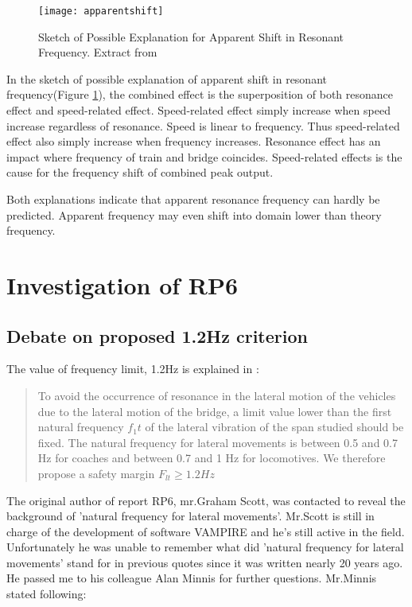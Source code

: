 \begin{figure}[h]
    \centering
    \texttt{[image: apparentshift]}
    \caption{Sketch of Possible Explanation for Apparent Shift in Resonant Frequency. Extract from \citet[Appendix 2]{d181dt329}}
    \label{fig:apparentshift}
\end{figure}

In the sketch of possible explanation of apparent shift in resonant frequency(Figure \ref{fig:apparentshift}), the combined effect is the superposition of both resonance effect and speed-related effect. Speed-related effect simply increase when speed increase regardless of resonance. Speed is linear to frequency. Thus speed-related effect also simply increase when frequency increases. Resonance effect has an impact where frequency of train and bridge coincides. Speed-related effects is the cause for the frequency shift of combined peak output.

Both explanations indicate that apparent resonance frequency can hardly be predicted. Apparent frequency may even shift into domain lower than theory frequency. 


\section{Investigation of RP6}

\subsection{Debate on proposed 1.2Hz criterion}\label{sec:1.2criterion329}

The value of frequency limit, 1.2Hz is explained in \citet[p3.2: Criterion 2]{d181}:

\begin{quote}
To avoid the occurrence of resonance in the lateral motion of the vehicles due to the lateral motion of the bridge, a limit value lower than the first natural frequency $f_1t$ of the lateral vibration of the span studied should be fixed. The natural frequency for lateral movements is between 0.5 and 0.7 Hz for coaches and between 0.7 and 1 Hz for locomotives. We therefore propose a safety margin $F_{lt} \geq 1.2Hz$

\end{quote}

The original author of report RP6, mr.Graham Scott, was contacted to reveal the background of 'natural frequency for lateral movements'. Mr.Scott is still in charge of the development of software VAMPIRE and he's still active in the field. Unfortunately he was unable to remember what did 'natural frequency for lateral movements' stand for in previous quotes since it was written nearly 20 years ago. He passed me to his colleague Alan Minnis for further questions. Mr.Minnis stated following:

